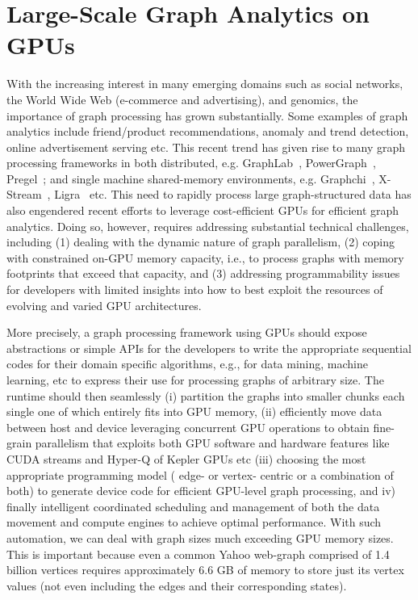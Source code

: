 \section{Large-Scale Graph Analytics on GPUs}
With the increasing interest in many emerging domains such as social networks, the World Wide Web (e-commerce and advertising), and genomics, the importance of graph processing has grown substantially. Some examples of graph analytics include friend/product recommendations, anomaly and trend detection, online advertisement serving etc. This recent trend has given rise to many graph processing frameworks in both distributed, e.g. GraphLab~\cite{graphlab}, PowerGraph~\cite{powergraph},  Pregel~\cite{pregel}; and single machine shared-memory environments, e.g.  Graphchi~\cite{chi}, X-Stream~\cite{xstream}, Ligra~\cite{ligra} etc. This need to rapidly process large graph-structured data has also engendered recent efforts to leverage cost-efficient GPUs for efficient graph analytics. Doing so, however, requires addressing substantial technical challenges, including (1) dealing with the dynamic nature of graph parallelism, (2) coping with constrained on-GPU memory capacity, i.e., to process graphs with memory footprints that exceed that capacity, and (3) addressing programmability issues for developers with limited insights into how to best exploit the resources of evolving and varied GPU architectures.

More precisely, a graph processing framework using GPUs should expose abstractions or simple APIs for the developers to write the appropriate sequential codes for their domain specific algorithms, e.g., for data mining, machine learning, etc to express their use for processing graphs of arbitrary size. The runtime should then seamlessly (i) partition the graphs into smaller chunks each single one of which entirely fits into GPU memory, (ii) efficiently move data between host and device leveraging concurrent GPU operations to obtain fine-grain parallelism that exploits both GPU software and hardware features like CUDA streams and Hyper-Q of Kepler GPUs etc (iii) choosing the most appropriate programming model ( edge- or vertex- centric or a combination of both) to generate device code for efficient GPU-level graph processing, and iv) finally intelligent coordinated scheduling and management of both the data movement and compute engines to achieve optimal performance. With such automation, we can deal with graph sizes much exceeding GPU memory sizes. This is important because even a common Yahoo web-graph comprised of 1.4 billion vertices requires approximately 6.6 GB of memory to store just its vertex values (not even including the edges and their corresponding states).


